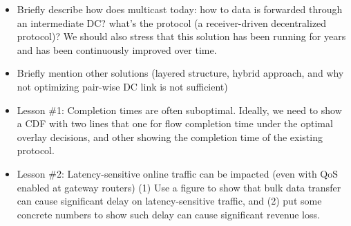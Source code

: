\begin{itemize}

\item Briefly describe how \company does multicast today: how to data is forwarded through an intermediate DC? what's the protocol (a receiver-driven decentralized protocol)?
We should also stress that this solution has been running for \fillme years and has been continuously improved over time.

\item Briefly mention other solutions (layered structure, hybrid approach, and why not optimizing pair-wise DC link is not sufficient)

\item Lesson \#1: Completion times are often suboptimal.
Ideally, we need to show a CDF with two lines that one for flow completion time under the optimal overlay decisions, and other showing the completion time of the existing protocol.

\item Lesson \#2: Latency-sensitive online traffic can be impacted (even with QoS enabled at gateway routers)
(1) Use a figure to show that bulk data transfer can cause significant delay on latency-sensitive traffic, and (2) put some concrete numbers to show such delay can cause significant revenue loss.

\end{itemize}


